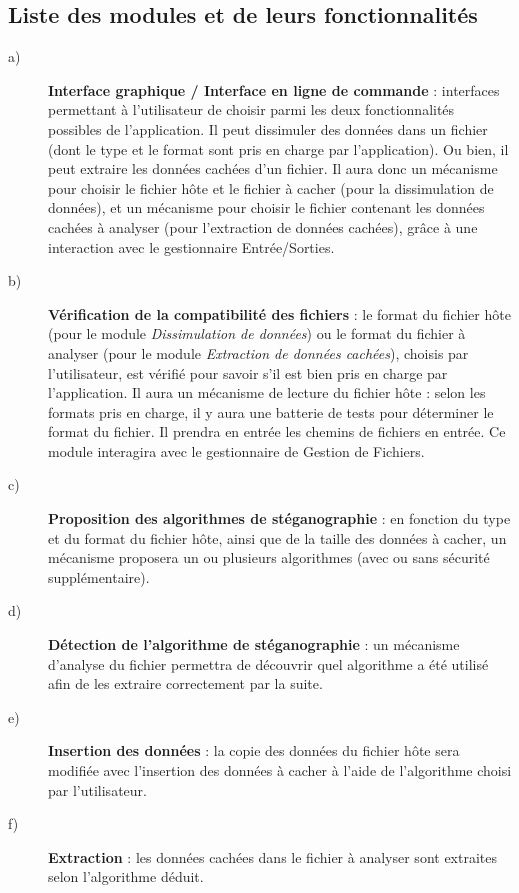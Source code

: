 \documentclass[11pt]{article}
\begin{document}
\subsection{Liste des modules et de leurs fonctionnalités}

\begin{description}
\item[a)] \textbf{Interface graphique / Interface en ligne de commande} :
    interfaces permettant à l'utilisateur de choisir parmi les deux
    fonctionnalités possibles de l'application. Il peut dissimuler des
    données dans un fichier (dont le type et le format sont pris en charge
    par l'application). Ou bien, il peut extraire les données cachées d'un
    fichier. \newline
    Il aura donc un mécanisme pour choisir le fichier hôte et le fichier 
    à cacher (pour la dissimulation de données), et un mécanisme pour choisir le 
    fichier contenant les données cachées à analyser (pour l'extraction de 
    données cachées), grâce à une interaction avec le gestionnaire Entrée/Sorties. 

\item[b)] \textbf{Vérification de la compatibilité des fichiers} : le format 
	du fichier hôte (pour le module \textit{Dissimulation de données}) ou 
	le format du fichier à analyser (pour le module \textit{Extraction de données 
	cachées}), choisis par l'utilisateur, est vérifié pour savoir s'il est 
	bien pris en charge par l'application. \newline
	Il aura un mécanisme de lecture du fichier hôte : selon les formats 
	pris en charge, il y aura une batterie de tests pour déterminer le 
	format du fichier. 
	Il prendra en entrée les chemins de fichiers en entrée. Ce module interagira
	avec le gestionnaire de Gestion de Fichiers. 

\item[c)] \textbf{Proposition des algorithmes de stéganographie} : en fonction
    du type et du format du fichier hôte, ainsi que de la taille des données à
    cacher, un mécanisme proposera un ou plusieurs algorithmes (avec ou sans 
    sécurité supplémentaire).  

\item[d)] \textbf{Détection de l'algorithme de stéganographie} : un mécanisme 
	d'analyse du fichier permettra de découvrir quel algorithme a été utilisé 
	afin de les extraire correctement par la suite. 

\item[e)] \textbf{Insertion des données} : la copie des données du fichier hôte
    sera modifiée avec l'insertion des données à cacher à l'aide de l'algorithme
    choisi par l'utilisateur. 

\item[f)] \textbf{Extraction} : les données cachées dans le fichier à analyser
    sont extraites selon l'algorithme déduit.

\end{description}
\newpage
\end{document}
